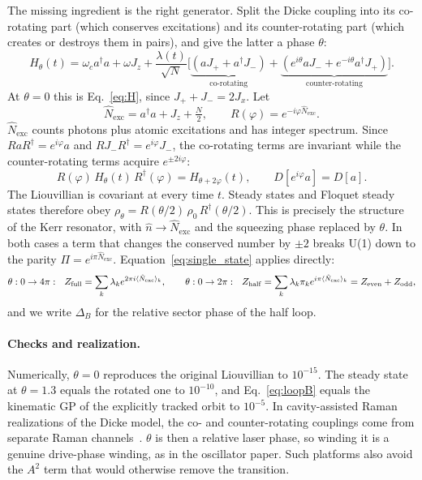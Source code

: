 \documentclass[11pt,a4paper]{article}
\newcommand{\ev}[1]{\langle #1\rangle}
\newcommand{\Nex}{\hat N_{\mathrm{exc}}}
\newcommand{\ad}{a^\dagger}
\newcommand{\Zeven}{Z_{\mathrm{even}}}
\newcommand{\Zodd}{Z_{\mathrm{odd}}}
\begin{document}
The missing ingredient is the right generator. Split the Dicke coupling into its co-rotating
part (which conserves excitations) and its counter-rotating part (which creates or destroys
them in pairs), and give the latter a phase $\theta$:
\begin{equation}
H_\theta(t)=\omega_c\ad a+\omega J_z+\frac{\lambda(t)}{\sqrt N}
\Big[\underbrace{(aJ_++\ad J_-)}_{\text{co-rotating}}
+\underbrace{(e^{i\theta}aJ_-+e^{-i\theta}\ad J_+)}_{\text{counter-rotating}}\Big].
\label{eq:Htheta}
\end{equation}
At $\theta=0$ this is Eq.~\eqref{eq:H}, since $J_++J_-=2J_x$. Let
\begin{equation}
\Nex=\ad a+J_z+\tfrac N2,\qquad R(\varphi)=e^{-i\varphi\Nex}.
\end{equation}
$\Nex$ counts photons plus atomic excitations and has integer spectrum. Since
$RaR^\dagger=e^{i\varphi}a$ and $RJ_-R^\dagger=e^{i\varphi}J_-$, the co-rotating terms are
invariant while the counter-rotating terms acquire $e^{\pm2i\varphi}$:
\begin{equation}
R(\varphi)\,H_\theta(t)\,R^\dagger(\varphi)=H_{\theta+2\varphi}(t),
\qquad D[e^{i\varphi}a]=D[a].
\label{eq:covariance}
\end{equation}
The Liouvillian is covariant at every time $t$. Steady states and Floquet steady states
therefore obey $\rho_\theta=R(\theta/2)\,\rho_0\,R^\dagger(\theta/2)$. This is precisely the
structure of the Kerr resonator, with $\hat n\to\Nex$ and the squeezing phase replaced by
$\theta$. In both cases a term that changes the conserved number by $\pm2$ breaks U(1) down to
the parity $\Pi=e^{i\pi\Nex}$. Equation~\eqref{eq:single_state} applies directly:
\begin{equation}
\theta:0\to4\pi:\ \ Z_{\rm full}=\sum_k\lambda_k e^{2\pi i\ev{\Nex}_k},
\qquad
\theta:0\to2\pi:\ \ Z_{\rm half}=\sum_k\lambda_k\pi_k e^{i\pi\ev{\Nex}_k}=\Zeven+\Zodd,
\label{eq:loopB}
\end{equation}
and we write $\Delta_B$ for the relative sector phase of the half loop.

\paragraph{Checks and realization.} Numerically, $\theta=0$ reproduces the original Liouvillian
to $10^{-15}$. The steady state at $\theta=1.3$ equals the rotated one to $10^{-10}$, and
Eq.~\eqref{eq:loopB} equals the kinematic GP of the explicitly tracked orbit to $10^{-5}$. In
cavity-assisted Raman realizations of the Dicke model, the co- and counter-rotating couplings
come from separate Raman channels~\cite{dimer2007}. $\theta$ is then a relative laser phase, so
winding it is a genuine drive-phase winding, as in the oscillator paper. Such platforms also
avoid the $A^2$ term that would otherwise remove the transition.
\end{document}
